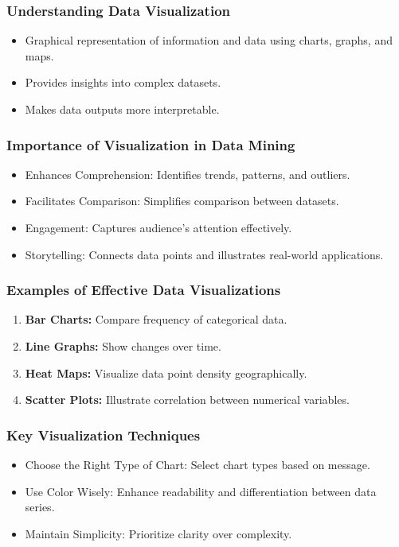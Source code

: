 \documentclass{beamer}
\begin{document}
\begin{frame}[fragile]
    \frametitle{Understanding Data Visualization}
    \begin{itemize}
        \item Graphical representation of information and data using charts, graphs, and maps.
        \item Provides insights into complex datasets.
        \item Makes data outputs more interpretable.
    \end{itemize}
\end{frame}

\begin{frame}[fragile]
    \frametitle{Importance of Visualization in Data Mining}
    \begin{itemize}
        \item Enhances Comprehension: Identifies trends, patterns, and outliers.
        \item Facilitates Comparison: Simplifies comparison between datasets.
        \item Engagement: Captures audience's attention effectively.
        \item Storytelling: Connects data points and illustrates real-world applications.
    \end{itemize}
\end{frame}

\begin{frame}[fragile]
    \frametitle{Examples of Effective Data Visualizations}
    \begin{enumerate}
        \item \textbf{Bar Charts:} Compare frequency of categorical data.
        \item \textbf{Line Graphs:} Show changes over time.
        \item \textbf{Heat Maps:} Visualize data point density geographically.
        \item \textbf{Scatter Plots:} Illustrate correlation between numerical variables.
    \end{enumerate}
\end{frame}

\begin{frame}[fragile]
    \frametitle{Key Visualization Techniques}
    \begin{itemize}
        \item Choose the Right Type of Chart: Select chart types based on message.
        \item Use Color Wisely: Enhance readability and differentiation between data series.
        \item Maintain Simplicity: Prioritize clarity over complexity.
    \end{itemize}
\end{frame}
\end{document}
